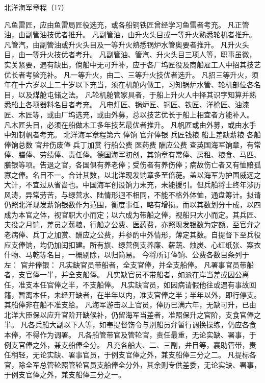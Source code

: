 \documentclass[12pt,UTF8]{ctexbook}
\begin{document}
北洋海军章程（17）

凡鱼雷匠，应由鱼雷局匠役选充，或各船铜铁匠曾经学习鱼雷者考充。
凡正管油，由副管油技优者推升。
凡副管油，由升火头目或一等升火熟悉轮机者推升。
凡管汽，由副管油或升火头目及一等升火熟悉锅炉水管奥要者推升。
凡升火头目，由一等升火技优者考升。
凡副管油、管汽、升火头目三项人等，职事虽微，实关紧要，遇有缺出，倘船中无可升补，应于各厂坞匠役及商船雇工人中招其技艺优长者考验充补。
凡一等升火，由二、三等升火技优者选升。
凡招三等升火，须年在十六岁以上二十岁以下充当，须在机舱内做工，习知锅炉水管、轮机部位各名目，以及煤舱屯储之法。
凡轮机舱管家具者，于船上升火人中择其识字知算并熟悉船上各项器料名目者考充。
凡电灯匠、锅炉匠、铜匠、铁匠、洋枪匠、油漆匠、木匠等，或由厂坞选充，或由外募，总以技艺优长于船上相宜者方能补入。
凡木匠头目，必须在船做木工多年技艺最优者推升。
凡帆匠或由外募，或由水手中知制帆者考充。
北洋海军章程第六
俸饷 官弁俸银 兵匠钱粮 船上差缺薪粮 各船俸饷总数 官弁伤废俸 兵丁加赏 行船公费 医药费 酬应公费
查英国海军饷章，有常俸、膳俸、劳绩俸、责任俸。德国海军初创，其饷章有常俸、房租、粮食、马匹、膳银等项。告退之官，各国俱有养老俸；受伤者有养伤俸；病故伤亡者又有恤赔孤寡之俸。名目不一。合计其数，以北洋现发饷章多至倍蓰。盖以海军为护国威远之大计，不宜过从省啬也。中国海军创设饷力末充，未能援引。但兵船将士终年涉历风涛，异常劳苦，与绿营水、陆情形迥不相同，不能不格外体恤，通盘筹计。拟请仍照北洋现发薪饷银数作为范围，衡度事任，略有增损。而以其数划分十成，以四成为本官之体，视官职大小而定；以六成为带船之俸，视船只大小而定。其兵匠、夫役之月饷，差员之薪粮，行船之公费、医药费，亦照现发银数为定额。至官弁之老病俸、兵丁之加赏、酬应之公费，并参酌中外情形，薄定其数。自提督下至兵役应支俸饷，均仍加闰扣建。所有旗、绿营例支养廉、薪蔬、烛炭、心红纸张、案衣什物、马乾等名目，一概剔除，以归简易。
今将所订俸饷、公费各数目条列于左：
官弁俸银：
凡实缺官员带船者，全支官俸，并全支船俸。
凡署事官员带船者，支官俸一半，并全支船俸。
凡实缺官员不带船者，如派在岸当差或因公离任，准支本任官俸之半，不支船俸。
凡实缺官员，如因病请假他往或遇有事故回籍，暂离本任，未经开缺者，在半年以内，准支官俸之半；半年以外，即行停支。其船俸非在船不准支给。
凡海军游击以上官员，俸历已满六年，无缺可升，已由北洋大臣保以应升官阶开缺候补，仍留海军当差者，准照保升之官阶，支食官俸之半。
凡各兵船大副以下人等，如奉提督饬令与别船员弁暂行调换操练，仍应各食本俸，不得作为调署。
凡各船管带官及管轮官，责任最重，无论实缺、署事，于例支官俸之外，兼支船俸全分。
凡充各船大、二、三副，弁目等，襄助管带，责任稍轻，无论实缺、署事官员，于例支官俸之外，兼支船俸三分之二。
凡提标各官，除全军总管轮照管轮官员支船俸全分外，其余则专供差委，无论实缺、署事，于例支官俸之外，兼支船俸三分之一。
\end{document}
